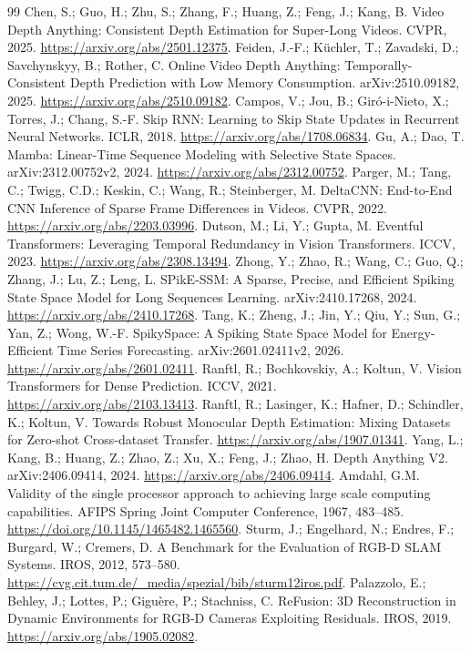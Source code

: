 \documentclass[mathematics,article,submit,moreauthors]{Definitions/mdpi}
\begin{document}
\begin{thebibliography}{99}
 Chen, S.; Guo, H.; Zhu, S.; Zhang, F.; Huang, Z.; Feng, J.; Kang, B.
Video Depth Anything: Consistent Depth Estimation for Super-Long Videos. CVPR, 2025.
\url{https://arxiv.org/abs/2501.12375}.
 Feiden, J.-F.; K\"uchler, T.; Zavadski, D.; Savchynskyy, B.; Rother, C.
Online Video Depth Anything: Temporally-Consistent Depth Prediction with Low Memory Consumption.
arXiv:2510.09182, 2025. \url{https://arxiv.org/abs/2510.09182}.
 Campos, V.; Jou, B.; Gir\'o-i-Nieto, X.; Torres, J.; Chang, S.-F.
Skip RNN: Learning to Skip State Updates in Recurrent Neural Networks. ICLR, 2018.
\url{https://arxiv.org/abs/1708.06834}.
 Gu, A.; Dao, T. Mamba: Linear-Time Sequence Modeling with Selective State Spaces.
arXiv:2312.00752v2, 2024. \url{https://arxiv.org/abs/2312.00752}.
 Parger, M.; Tang, C.; Twigg, C.D.; Keskin, C.; Wang, R.; Steinberger, M.
DeltaCNN: End-to-End CNN Inference of Sparse Frame Differences in Videos. CVPR, 2022.
\url{https://arxiv.org/abs/2203.03996}.
 Dutson, M.; Li, Y.; Gupta, M.
Eventful Transformers: Leveraging Temporal Redundancy in Vision Transformers. ICCV, 2023.
\url{https://arxiv.org/abs/2308.13494}.
 Zhong, Y.; Zhao, R.; Wang, C.; Guo, Q.; Zhang, J.; Lu, Z.; Leng, L.
SPikE-SSM: A Sparse, Precise, and Efficient Spiking State Space Model for Long Sequences Learning.
arXiv:2410.17268, 2024. \url{https://arxiv.org/abs/2410.17268}.
 Tang, K.; Zheng, J.; Jin, Y.; Qiu, Y.; Sun, G.; Yan, Z.; Wong, W.-F.
SpikySpace: A Spiking State Space Model for Energy-Efficient Time Series Forecasting.
arXiv:2601.02411v2, 2026. \url{https://arxiv.org/abs/2601.02411}.
 Ranftl, R.; Bochkovskiy, A.; Koltun, V.
Vision Transformers for Dense Prediction. ICCV, 2021. \url{https://arxiv.org/abs/2103.13413}.
 Ranftl, R.; Lasinger, K.; Hafner, D.; Schindler, K.; Koltun, V.
Towards Robust Monocular Depth Estimation: Mixing Datasets for Zero-shot Cross-dataset Transfer.
\url{https://arxiv.org/abs/1907.01341}.
 Yang, L.; Kang, B.; Huang, Z.; Zhao, Z.; Xu, X.; Feng, J.; Zhao, H.
Depth Anything V2. arXiv:2406.09414, 2024. \url{https://arxiv.org/abs/2406.09414}.
 Amdahl, G.M. Validity of the single processor approach to achieving
large scale computing capabilities. AFIPS Spring Joint Computer Conference, 1967, 483--485.
\url{https://doi.org/10.1145/1465482.1465560}.
 Sturm, J.; Engelhard, N.; Endres, F.; Burgard, W.; Cremers, D.
A Benchmark for the Evaluation of RGB-D SLAM Systems. IROS, 2012, 573--580.
\url{https://cvg.cit.tum.de/_media/spezial/bib/sturm12iros.pdf}.
 Palazzolo, E.; Behley, J.; Lottes, P.; Gigu\`ere, P.; Stachniss, C.
ReFusion: 3D Reconstruction in Dynamic Environments for RGB-D Cameras Exploiting Residuals.
IROS, 2019. \url{https://arxiv.org/abs/1905.02082}.
\end{thebibliography}
\end{document}
